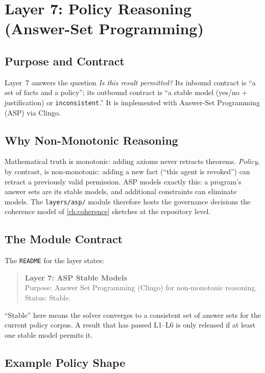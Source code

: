 \chapter{Layer 7: Policy Reasoning (Answer-Set Programming)}
\label{ch:policy}

\section{Purpose and Contract}
\label{sec:policy-purpose}

Layer~7 answers the question \emph{Is this result permitted?} Its inbound
contract is ``a set of facts and a policy''; its outbound contract is ``a
stable model (yes/no + justification) or \texttt{inconsistent}.'' It is
implemented with Answer-Set Programming (ASP) via Clingo.

\section{Why Non-Monotonic Reasoning}
\label{sec:policy-asp}

Mathematical truth is monotonic: adding axioms never retracts theorems.
\emph{Policy}, by contrast, is non-monotonic: adding a new fact (``this agent
is revoked'') can retract a previously valid permission. ASP models exactly
this: a program's answer sets are its stable models, and additional
constraints can eliminate models. The \texttt{layers/asp/} module therefore
hosts the governance decisions the coherence model of \cref{ch:coherence}
sketches at the repository level.

\section{The Module Contract}
\label{sec:policy-module}

The \texttt{README} for the layer states:
\begin{quote}
\textbf{Layer 7: ASP Stable Models} \\
Purpose: Answer Set Programming (Clingo) for non-monotonic reasoning. \\
Status: Stable.
\end{quote}
``Stable'' here means the solver converges to a consistent set of answer sets
for the current policy corpus. A result that has passed L1--L6 is only
released if at least one stable model permits it.

\section{Example Policy Shape}
\label{sec:policy-example}

